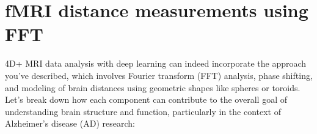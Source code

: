 \documentclass[twocolumn]{article}
\begin{document}
\section{fMRI distance measurements using FFT}







4D+ MRI data analysis with deep learning can indeed incorporate the approach you've described, which involves Fourier transform (FFT) analysis, phase shifting, and modeling of brain distances using geometric shapes like spheres or toroids. Let's break down how each component can contribute to the overall goal of understanding brain structure and function, particularly in the context of Alzheimer's disease (AD) research:
\end{document}
